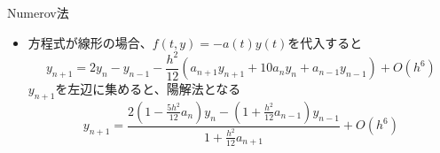 \begin{frame}[t,fragile]{Numerov法}
  \begin{itemize}
  \item 方程式が線形の場合、$f(t,y) = -a(t) y(t)$を代入すると
    \[
    y_{n+1} = 2y_n - y_{n-1} - \frac{h^2}{12} (a_{n+1}y_{n+1} + 10a_{n}y_{n} + a_{n-1}y_{n-1}) + O(h^6)
    \]
  $y_{n+1}$を左辺に集めると、陽解法となる
    \[
    y_{n+1} = \frac{2 (1-\frac{5h^2}{12} a_n)y_n - (1 + \frac{h^2}{12} a_{n-1}) y_{n-1}}{1 + \frac{h^2}{12} a_{n+1}} + O(h^6)
    \]
  \end{itemize}
\end{frame}
